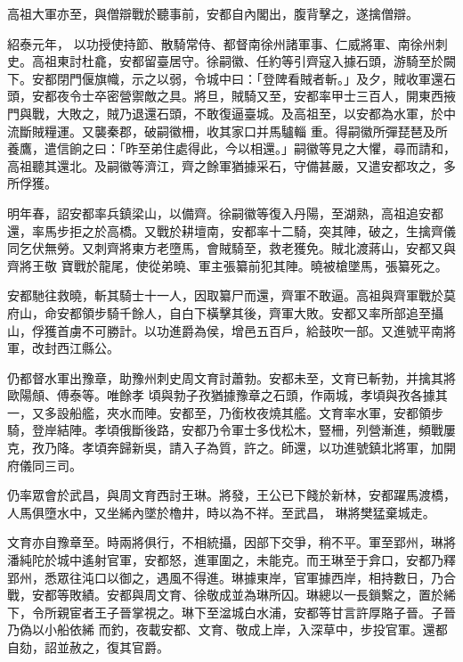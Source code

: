 \begin{pinyinscope}
 高祖大軍亦至，與僧辯戰於聽事前，安都自內閣出，腹背擊之，遂擒僧辯。



 紹泰元年，
 以功授使持節、散騎常侍、都督南徐州諸軍事、仁威將軍、南徐州刺史。高祖東討杜龕，安都留臺居守。徐嗣徽、任約等引齊寇入據石頭，游騎至於闕下。安都閉門偃旗幟，示之以弱，令城中曰：「登陴看賊者斬。」及夕，賊收軍還石頭，安都夜令士卒密營禦敵之具。將旦，賊騎又至，安都率甲士三百人，開東西掖門與戰，大敗之，賊乃退還石頭，不敢復逼臺城。及高祖至，以安都為水軍，於中流斷賊糧運。又襲秦郡，破嗣徽柵，收其家口并馬驢輜
 重。得嗣徽所彈琵琶及所養鷹，遣信餉之曰：「昨至弟住處得此，今以相還。」嗣徽等見之大懼，尋而請和，高祖聽其還北。及嗣徽等濟江，齊之餘軍猶據采石，守備甚嚴，又遣安都攻之，多所俘獲。



 明年春，詔安都率兵鎮梁山，以備齊。徐嗣徽等復入丹陽，至湖熟，高祖追安都還，率馬步拒之於高橋。又戰於耕壇南，安都率十二騎，突其陣，破之，生擒齊儀同乞伏無勞。又刺齊將東方老墮馬，會賊騎至，救老獲免。賊北渡蔣山，安都又與齊將王敬
 寶戰於龍尾，使從弟曉、軍主張纂前犯其陣。曉被槍墜馬，張纂死之。



 安都馳往救曉，斬其騎士十一人，因取纂尸而還，齊軍不敢逼。高祖與齊軍戰於莫府山，命安都領步騎千餘人，自白下橫擊其後，齊軍大敗。安都又率所部追至攝山，俘獲首虜不可勝計。以功進爵為侯，增邑五百戶，給鼓吹一部。又進號平南將軍，改封西江縣公。



 仍都督水軍出豫章，助豫州刺史周文育討蕭勃。安都未至，文育已斬勃，并擒其將歐陽頠、傅泰等。唯餘孝
 頃與勃子孜猶據豫章之石頭，作兩城，孝頃與孜各據其一，又多設船艦，夾水而陣。安都至，乃銜枚夜燒其艦。文育率水軍，安都領步騎，登岸結陣。孝頃俄斷後路，安都乃令軍士多伐松木，豎柵，列營漸進，頻戰屢克，孜乃降。孝頃奔歸新吳，請入子為質，許之。師還，以功進號鎮北將軍，加開府儀同三司。



 仍率眾會於武昌，與周文育西討王琳。將發，王公已下餞於新林，安都躍馬渡橋，人馬俱墮水中，又坐絺內墜於櫓井，時以為不祥。至武昌，
 琳將樊猛棄城走。



 文育亦自豫章至。時兩將俱行，不相統攝，因部下交爭，稍不平。軍至郢州，琳將潘純陀於城中遙射官軍，安都怒，進軍圍之，未能克。而王琳至于弇口，安都乃釋郢州，悉眾往沌口以御之，遇風不得進。琳據東岸，官軍據西岸，相持數日，乃合戰，安都等敗績。安都與周文育、徐敬成並為琳所囚。琳總以一長鎖繫之，置於絺下，令所親宦者王子晉掌視之。琳下至湓城白水浦，安都等甘言許厚賂子晉。子晉乃偽以小船依絺
 而釣，夜載安都、文育、敬成上岸，入深草中，步投官軍。還都自劾，詔並赦之，復其官爵。




\end{pinyinscope}

